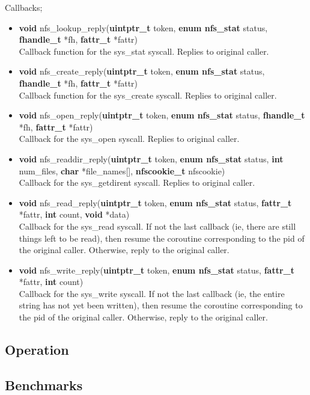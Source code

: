 \documentclass[12pt]{article}
\begin{document}
Callbacks;
\begin{itemize}
\item \textbf{void} nfs\_lookup\_reply(\textbf{uintptr\_t} token, \textbf{enum nfs\_stat} status, \textbf{fhandle\_t} *fh, \textbf{fattr\_t} *fattr)\\
Callback function for the sys\_stat syscall. Replies to original caller.
\item \textbf{void} nfs\_create\_reply(\textbf{uintptr\_t} token, \textbf{enum nfs\_stat} status, \textbf{fhandle\_t} *fh, \textbf{fattr\_t} *fattr)\\
Callback function for the sys\_create syscall. Replies to original caller.
\item \textbf{void} nfs\_open\_reply(\textbf{uintptr\_t} token, \textbf{enum nfs\_stat} status, \textbf{fhandle\_t} *fh, \textbf{fattr\_t} *fattr)\\
Callback for the sys\_open syscall. Replies to original caller.
\item \textbf{void} nfs\_readdir\_reply(\textbf{uintptr\_t} token, \textbf{enum nfs\_stat} status, \textbf{int} num\_files, \textbf{char} *file\_names[], \textbf{nfscookie\_t} nfscookie)\\
Callback for the sys\_getdirent syscall. Replies to original caller.
\item \textbf{void} nfs\_read\_reply(\textbf{uintptr\_t} token, \textbf{enum nfs\_stat} status, \textbf{fattr\_t} *fattr, \textbf{int} count, \textbf{void} *data)\\
Callback for the sys\_read syscall. If not the last callback (ie, there are still things left to be read), then resume the coroutine corresponding to the pid of the original caller. Otherwise, reply to the original caller.
\item \textbf{void} nfs\_write\_reply(\textbf{uintptr\_t} token, \textbf{enum nfs\_stat} status, \textbf{fattr\_t} *fattr, \textbf{int} count)\\
Callback for the sys\_write syscall. If not the last callback (ie, the entire string has not yet been written), then resume the coroutine corresponding to the pid of the original caller. Otherwise, reply to the original caller.
\end{itemize}
\subsection{Operation}
\subsection{Benchmarks}
\end{document}
